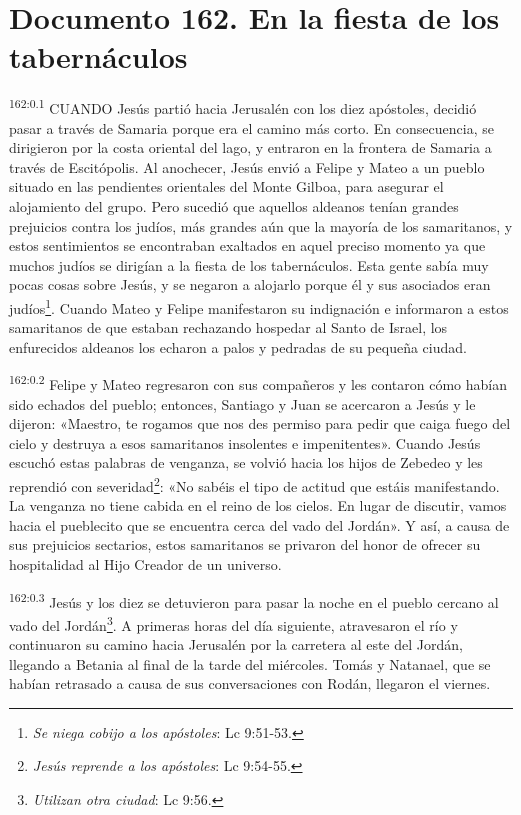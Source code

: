 \chapter{Documento 162. En la fiesta de los tabernáculos}
\par 
\textsuperscript{162:0.1} CUANDO Jesús partió hacia Jerusalén con los diez apóstoles, decidió pasar a través de Samaria porque era el camino más corto. En consecuencia, se dirigieron por la costa oriental del lago, y entraron en la frontera de Samaria a través de Escitópolis. Al anochecer, Jesús envió a Felipe y Mateo a un pueblo situado en las pendientes orientales del Monte Gilboa, para asegurar el alojamiento del grupo. Pero sucedió que aquellos aldeanos tenían grandes prejuicios contra los judíos, más grandes aún que la mayoría de los samaritanos, y estos sentimientos se encontraban exaltados en aquel preciso momento ya que muchos judíos se dirigían a la fiesta de los tabernáculos. Esta gente sabía muy pocas cosas sobre Jesús, y se negaron a alojarlo porque él y sus asociados eran judíos\footnote{\textit{Se niega cobijo a los apóstoles}: Lc 9:51-53.}. Cuando Mateo y Felipe manifestaron su indignación e informaron a estos samaritanos de que estaban rechazando hospedar al Santo de Israel, los enfurecidos aldeanos los echaron a palos y pedradas de su pequeña ciudad.

\par 
\textsuperscript{162:0.2} Felipe y Mateo regresaron con sus compañeros y les contaron cómo habían sido echados del pueblo; entonces, Santiago y Juan se acercaron a Jesús y le dijeron: «Maestro, te rogamos que nos des permiso para pedir que caiga fuego del cielo y destruya a esos samaritanos insolentes e impenitentes». Cuando Jesús escuchó estas palabras de venganza, se volvió hacia los hijos de Zebedeo y les reprendió con severidad\footnote{\textit{Jesús reprende a los apóstoles}: Lc 9:54-55.}: «No sabéis el tipo de actitud que estáis manifestando. La venganza no tiene cabida en el reino de los cielos. En lugar de discutir, vamos hacia el pueblecito que se encuentra cerca del vado del Jordán». Y así, a causa de sus prejuicios sectarios, estos samaritanos se privaron del honor de ofrecer su hospitalidad al Hijo Creador de un universo.

\par 
\textsuperscript{162:0.3} Jesús y los diez se detuvieron para pasar la noche en el pueblo cercano al vado del Jordán\footnote{\textit{Utilizan otra ciudad}: Lc 9:56.}. A primeras horas del día siguiente, atravesaron el río y continuaron su camino hacia Jerusalén por la carretera al este del Jordán, llegando a Betania al final de la tarde del miércoles. Tomás y Natanael, que se habían retrasado a causa de sus conversaciones con Rodán, llegaron el viernes.

